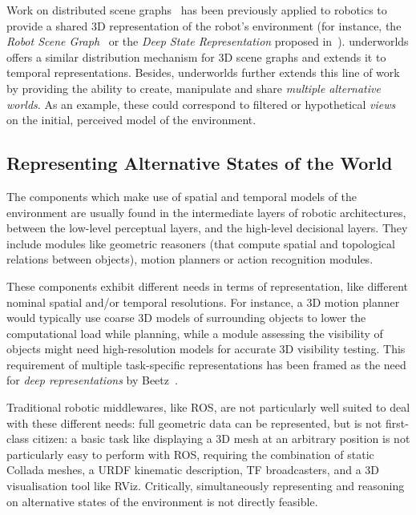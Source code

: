 \documentclass[letterpaper, 10pt, conference]{ieeeconf}
\newcommand{\eg}{e.g.,\xspace}
\newcommand{\uwds}{{\sc underworlds}\xspace}
\begin{document}
Work on distributed scene graphs~\cite{naef2003blue} has been previously applied
to robotics to provide a shared 3D representation of the robot's environment
(for instance, the \emph{Robot Scene Graph}~\cite{blumenthal2013scene} or the
\emph{Deep State Representation} proposed in~\cite{bustos2016unified}).  \uwds
offers a similar distribution mechanism for 3D scene graphs and extends it to
temporal representations. Besides, \uwds further extends this line of work by
providing the ability to create, manipulate and share \emph{multiple alternative
worlds}. As an example, these could correspond to filtered or hypothetical
\emph{views} on the initial, perceived model of the environment.

\subsection{Representing Alternative States of the World}

The components which make use of spatial and temporal models of the environment
are usually found in the intermediate layers of robotic architectures, between
the low-level perceptual layers, and the high-level decisional layers. They
include modules like geometric reasoners (that compute spatial and topological
relations between objects), motion planners or action recognition modules.

These components exhibit different needs in terms of representation,
like different nominal spatial and/or temporal resolutions. For instance, a 3D
motion planner would typically use coarse 3D models of surrounding objects to
lower the computational load while planning, while a module assessing the
visibility of objects might need high-resolution models 
for accurate 3D visibility testing. This requirement of multiple
task-specific representations has been framed as the need for \emph{deep
representations} by Beetz~\cite{beetz2010towards}.


Traditional robotic middlewares, like ROS, are not particularly well suited to
deal with these different needs: full geometric data can be represented, but is
not first-class citizen: a basic task like displaying a 3D mesh at an arbitrary
position is not particularly easy to perform with ROS, requiring the combination
of static Collada meshes, a URDF kinematic description, TF broadcasters, and a
3D visualisation tool like RViz. Critically, simultaneously representing and
reasoning on alternative states of the environment is not directly feasible.
\end{document}
